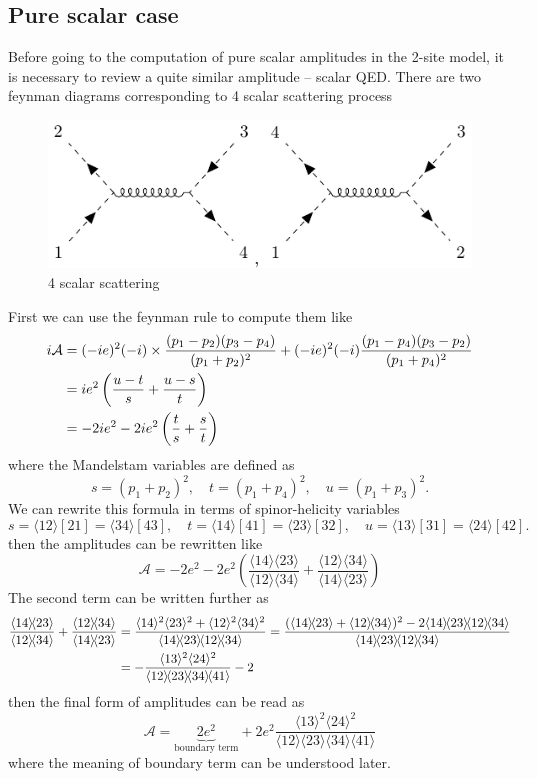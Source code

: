 \documentclass[12pt]{article}
\numberwithin{equation}{section}
\newcommand{\mdavg}[2]{\langle #1 \rangle\!\langle #2 \rangle}
\newcommand{\avg}[1]{\langle #1 \rangle}
\newcommand{\cbrak}[2]{\avg{#1}\![#2]}
\begin{document}
\subsection{Pure scalar case}
Before going to the computation of pure scalar amplitudes in the 2-site model, it is necessary to review a quite similar amplitude -- scalar QED.
There are two feynman diagrams corresponding to 4 scalar scattering process 
\begin{figure}[H]
    \centering
    \includegraphics{s4pt.pdf}
    \caption{4 scalar scattering}
\end{figure}
First we can use the feynman rule to compute them like
\begin{align}
    i\mathcal{A}&=(-ie)^2(-i)\times\frac{(p_1-p_2)(p_3-p_4)}{(p_1+p_2)^2}+(-ie)^2(-i)\frac{(p_1-p_4)(p_3-p_2)}{(p_1+p_4)^2}\notag\\
    &=ie^2\left(\frac{u-t}{s}+\frac{u-s}{t}\right)\notag\\
    &=-2ie^2-2ie^2\left(\frac{t}{s}+\frac{s}{t}\right)
\end{align}
where the Mandelstam variables are defined as 
\begin{equation}
    s=(p_1+p_2)^2,\quad t=(p_1+p_4)^2,\quad u=(p_1+p_3)^2.
\end{equation}
We can rewrite this formula in terms of spinor-helicity variables
\begin{equation}
    s=\cbrak{12}{21}=\cbrak{34}{43},\quad t=\cbrak{14}{41}=\cbrak{23}{32},\quad u=\cbrak{13}{31}=\cbrak{24}{42}.
\end{equation}
then the amplitudes can be rewritten like
\begin{equation}
    \mathcal{A}=-2e^2-2e^2\left(\frac{\mdavg{14}{23}}{\mdavg{12}{34}}+\frac{\mdavg{12}{34}}{\mdavg{14}{23}}\right)
\end{equation}
The second term can be written further as
\begin{align}
    \frac{\mdavg{14}{23}}{\mdavg{12}{34}}+\frac{\mdavg{12}{34}}{\mdavg{14}{23}}&=\frac{\avg{14}^2\avg{23}^2+\avg{12}^2\avg{34}^2}{\mdavg{14}{23}\!\mdavg{12}{34}}=\frac{(\mdavg{14}{23}+\mdavg{12}{34})^2-2\mdavg{14}{23}\!\mdavg{12}{34}}{\mdavg{14}{23}\!\mdavg{12}{34}}\notag\\
    &=-\frac{\avg{13}^2\avg{24}^2}{\mdavg{12}{23}\!\mdavg{34}{41}}-2
\end{align}
then the final form of amplitudes can be read as
\begin{equation}
    \mathcal{A}=\underbrace{2e^2}_{\text{boundary term}}+2e^2\frac{\avg{13}^2\avg{24}^2}{\mdavg{12}{23}\!\mdavg{34}{41}}
    \label{4.68}
\end{equation}
where the meaning of boundary term can be understood later.
\end{document}
